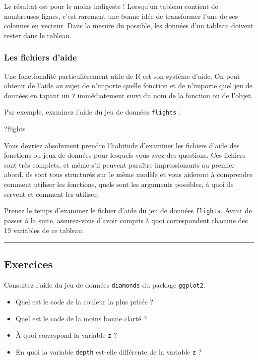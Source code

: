 \documentclass[a4paperpaper,]{article}
\newenvironment{Shaded}{\begin{snugshade}}{\end{snugshade}}
\newcommand{\NormalTok}[1]{\textcolor[rgb]{0.12,0.11,0.11}{#1}}
\providecommand{\tightlist}{%
  \setlength{\itemsep}{0pt}\setlength{\parskip}{0pt}}
\theoremstyle{definition}
\theoremstyle{definition}
\theoremstyle{definition}
\theoremstyle{remark}
\begin{document}
Le résultat est pour le moins indigeste ! Lorsqu'un tableau contient de
nombreuses lignes, c'est rarement une bonne idée de transformer l'une de
ses colonnes en vecteur. Dans la mesure du possible, les données d'un
tableau doivent rester dans le tableau.

\hypertarget{les-fichiers-daide}{%
\subsubsection{Les fichiers d'aide}\label{les-fichiers-daide}}

Une fonctionalité particulièrement utile de R est son système d'aide. On
peut obtenir de l'aide au sujet de n'importe quelle fonction et de
n'importe quel jeu de données en tapant un \texttt{?} immédiatement
suivi du nom de la fonction ou de l'objet.

Par exemple, examinez l'aide du jeu de données \texttt{flights} :

\begin{Shaded}
\begin{Highlighting}[]
\NormalTok{?flights}
\end{Highlighting}
\end{Shaded}

Vous devriez absolument prendre l'habitude d'examiner les fichiers
d'aide des fonctions ou jeux de données pour lesquels vous avez des
questions. Ces fichiers sont très complets, et même s'il peuvent
paraître impressionants au premier abord, ils sont tous structurés sur
le même modèle et vous aideront à comprendre comment utiliser les
fonctions, quels sont les arguments possibles, à quoi ils servent et
comment les utiliser.

Prenez le temps d'examiner le fichier d'aide du jeu de données
\texttt{flights}. Avant de passer à la suite, assurez-vous d'avoir
compris à quoi correspondent chacune des 19 variables de ce tableau.

\begin{center}\rule{0.5\linewidth}{\linethickness}\end{center}

\hypertarget{exercices-1}{%
\subsection{Exercices}\label{exercices-1}}

Consultez l'aide du jeu de données \texttt{diamonds} du package
\texttt{ggplot2}.

\begin{itemize}
\tightlist
\item
  Quel est le code de la couleur la plus prisée ?
\item
  Quel est le code de la moins bonne clarté ?
\item
  À quoi correspond la variable \texttt{z} ?
\item
  En quoi la variable \texttt{depth} est-elle différente de la variable
  \texttt{z} ?
\end{itemize}
\end{document}
